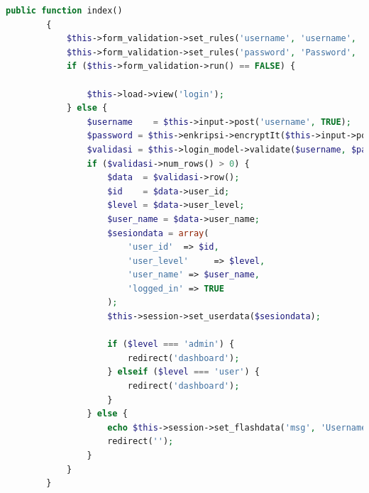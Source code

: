 \begin{lstlisting}[language=PHP]
	 public function index()  
	    {  
	        $this->form_validation->set_rules('username', 'username', 'required');  
	        $this->form_validation->set_rules('password', 'Password', 'required|min_length[4]');  
	        if ($this->form_validation->run() == FALSE) {  
	  
	            $this->load->view('login'); 
	        } else {  
	            $username    = $this->input->post('username', TRUE);  
	            $password = $this->enkripsi->encryptIt($this->input->post('password', TRUE));  
	            $validasi = $this->login_model->validate($username, $password);  
	            if ($validasi->num_rows() > 0) {  
	                $data  = $validasi->row();  
	                $id    = $data->user_id;  
	                $level = $data->user_level;  
	                $user_name = $data->user_name; 
	                $sesiondata = array(  
	                    'user_id'  => $id,  
	                    'user_level'     => $level,  
	                    'user_name' => $user_name,  
	                    'logged_in' => TRUE  
	                );  
	                $this->session->set_userdata($sesiondata);  
	  
	                if ($level === 'admin') { 
	                    redirect('dashboard');  
	                } elseif ($level === 'user') {  
	                    redirect('dashboard');  
	                }  
	            } else {  
	                echo $this->session->set_flashdata('msg', 'Username or Password is Wrong');  
	                redirect('');  
	            }  
	        }  
	    } 
\end{lstlisting}

